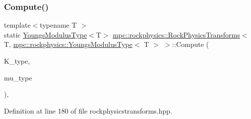 \subsubsection{\texorpdfstring{Compute()}{Compute()}\hspace{0.1cm}{\footnotesize\ttfamily [3/6]}}
{\footnotesize\ttfamily template$<$typename T $>$ \\
static \mbox{\hyperlink{structmpc_1_1rockphysics_1_1_youngs_modulus_type}{Youngs\+Modulus\+Type}}$<$T$>$ \mbox{\hyperlink{structmpc_1_1rockphysics_1_1_rock_physics_transforms}{mpc\+::rockphysics\+::\+Rock\+Physics\+Transforms}}$<$ T, \mbox{\hyperlink{structmpc_1_1rockphysics_1_1_youngs_modulus_type}{mpc\+::rockphysics\+::\+Youngs\+Modulus\+Type}}$<$ T $>$ $>$\+::Compute (\begin{DoxyParamCaption}\item[{const \mbox{\hyperlink{structmpc_1_1rockphysics_1_1_bulk_modulus_type}{mpc\+::rockphysics\+::\+Bulk\+Modulus\+Type}}$<$ T $>$ \&}]{K\+\_\+type,  }\item[{const \mbox{\hyperlink{structmpc_1_1rockphysics_1_1_shear_modulus_type}{mpc\+::rockphysics\+::\+Shear\+Modulus\+Type}}$<$ T $>$ \&}]{mu\+\_\+type }\end{DoxyParamCaption})\hspace{0.3cm}{\ttfamily [inline]}, {\ttfamily [static]}}



Definition at line 180 of file rockphysicstransforms.\+hpp.

\mbox{\label{structmpc_1_1rockphysics_1_1_rock_physics_transforms_3_01_t_00_01mpc_1_1rockphysics_1_1_youngs_modulus_type_3_01_t_01_4_01_4_a6a0e6a8727dce17856729dce8f70a39f}} 

